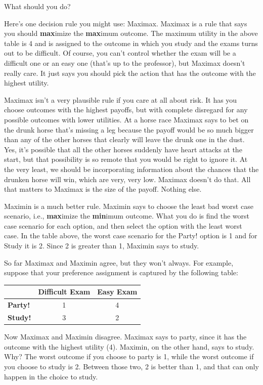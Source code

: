 \documentclass[]{tufte-book}
\begin{document}
What should you do?

Here's one decision rule you might use: Maximax. Maximax is a rule that says you should \textbf{max}imize the \textbf{max}imum outcome. The maximum utility in the above table is 4 and is assigned to the outcome in which you study and the exams turns out to be difficult. Of course, you can't control whether the exam will be a difficult one or an easy one (that's up to the professor), but Maximax doesn't really care. It just says you should pick the action that has the outcome with the highest utility.

Maximax isn't a very plausible rule if you care at all about risk. It has you choose outcomes with the highest payoffs, but with complete disregard for any possible outcomes with lower utilities. At a horse race Maximax says to bet on the drunk horse that's missing a leg because the payoff would be so much bigger than any of the other horses that clearly will leave the drunk one in the dust. Yes, it's possible that all the other horses suddenly have heart attacks at the start, but that possibility is so remote that you would be right to ignore it. At the very least, we should be incorporating information about the chances that the drunken horse will win, which are very, very low. Maximax doesn't do that. All that matters to Maximax is the size of the payoff. Nothing else.

Maximin is a much better rule. Maximin says to choose the least bad worst case scenario, i.e., \textbf{max}imize the \textbf{min}imum outcome. What you do is find the worst case scenario for each option, and then select the option with the least worst case. In the table above, the worst case scenario for the Party! option is 1 and for Study it is 2. Since 2 is greater than 1, Maximin says to study.

So far Maximax and Maximin agree, but they won't always. For example, suppose that your preference assignment is captured by the following table:

\begin{longtable}[]{@{}lcc@{}}
\toprule
& Difficult Exam & Easy Exam\tabularnewline
\midrule
\endhead
\textbf{Party!} & 1 & 4\tabularnewline
\textbf{Study!} & 3 & 2\tabularnewline
\bottomrule
\end{longtable}

Now Maximax and Maximin disagree. Maximax says to party, since it has the outcome with the highest utility (4). Maximin, on the other hand, says to study. Why? The worst outcome if you choose to party is 1, while the worst outcome if you choose to study is 2. Between those two, 2 is better than 1, and that can only happen in the choice to study.
\end{document}
